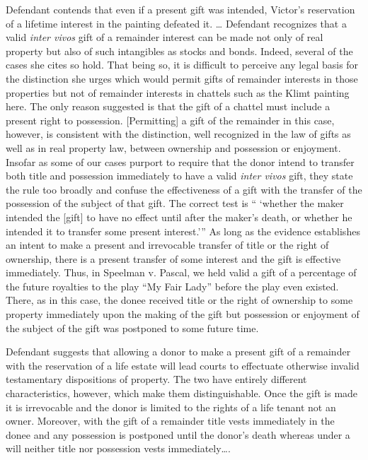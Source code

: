 Defendant contends that even if a present gift was intended, Victor's
reservation of a lifetime interest in the painting defeated it. \dots{}
Defendant recognizes that a valid \textit{inter vivos} gift of a remainder
interest can be made not only of real property but also of such intangibles as
stocks and bonds. Indeed, several of the cases she cites so hold. That being
so, it is difficult to perceive any legal basis for the distinction she urges
which would permit gifts of remainder interests in those properties but not of
remainder interests in chattels such as the Klimt painting here. The only
reason suggested is that the gift of a chattel must include a present right to
possession. [Permitting] a gift of the remainder in this case, however, is
consistent with the distinction, well recognized in the law of gifts as well as
in real property law, between ownership and possession or enjoyment. Insofar as
some of our cases purport to require that the donor intend to transfer both
title and possession immediately to have a valid \textit{inter vivos} gift,
they state the rule too broadly and confuse the effectiveness of a gift with
the transfer of the possession of the subject of that gift. The correct test is
`` `whether the maker intended the [gift] to have no effect until after the
maker's death, or whether he intended it to transfer some present
interest.'{}'' As long as the evidence establishes an intent to make a present
and irrevocable transfer of title or the right of ownership, there is a present
transfer of some interest and the gift is effective immediately. Thus, in
Speelman v. Pascal, we held valid a gift of a percentage of the future
royalties to the play ``My Fair Lady'' before the play even existed. There, as
in this case, the donee received title or the right of ownership to some
property immediately upon the making of the gift but possession or enjoyment of
the subject of the gift was postponed to some future time.

 Defendant suggests that allowing a donor to make a present gift of a remainder 
with the reservation of a life estate will lead courts to effectuate otherwise
invalid testamentary dispositions of property. The two have entirely different
characteristics, however, which make them distinguishable. Once the gift is
made it is irrevocable and the donor is limited to the rights of a life tenant
not an owner. Moreover, with the gift of a remainder title vests immediately in
the donee and any possession is postponed until the donor's death whereas under
a will neither title nor possession vests immediately\dots{}. 

